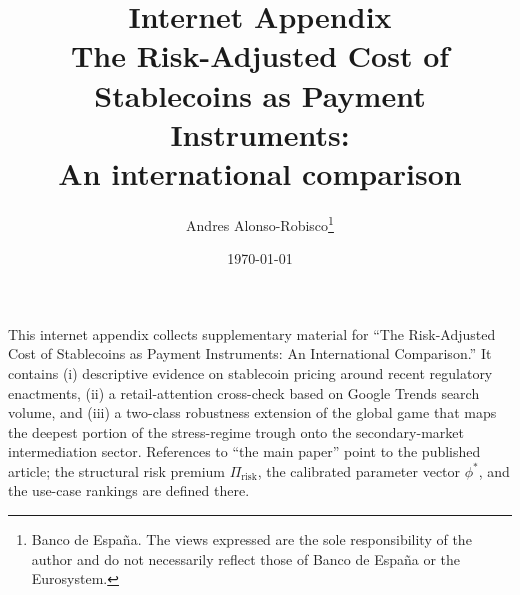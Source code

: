 \documentclass[12pt]{article}
\title{Internet Appendix\\
The Risk-Adjusted Cost of Stablecoins as Payment Instruments:\\
An international comparison}
\author{Andres Alonso-Robisco\thanks{Banco de Espa\~na. The views expressed are
the sole responsibility of the author and do not necessarily reflect those of
Banco de Espa\~na or the Eurosystem.}}
\date{\today}
\begin{document}
\maketitle
\onehalfspacing

\noindent This internet appendix collects supplementary material for ``The Risk-Adjusted Cost of Stablecoins as Payment Instruments: An International Comparison.'' It contains (i) descriptive evidence on stablecoin pricing around recent regulatory enactments, (ii) a retail-attention cross-check based on Google Trends search volume, and (iii) a two-class robustness extension of the global game that maps the deepest portion of the stress-regime trough onto the secondary-market intermediation sector. References to ``the main paper'' point to the published article; the structural risk premium $\Pi_{\text{risk}}$, the calibrated parameter vector $\phi^*$, and the use-case rankings are defined there.



\clearpage


\end{document}
